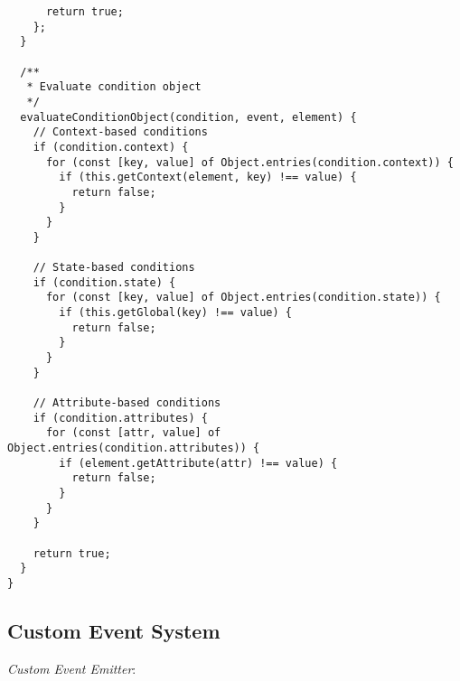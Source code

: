 \documentclass[11pt]{article}
\begin{document}
\begin{verbatim}
      return true;
    };
  }
  
  /**
   * Evaluate condition object
   */
  evaluateConditionObject(condition, event, element) {
    // Context-based conditions
    if (condition.context) {
      for (const [key, value] of Object.entries(condition.context)) {
        if (this.getContext(element, key) !== value) {
          return false;
        }
      }
    }
    
    // State-based conditions
    if (condition.state) {
      for (const [key, value] of Object.entries(condition.state)) {
        if (this.getGlobal(key) !== value) {
          return false;
        }
      }
    }
    
    // Attribute-based conditions
    if (condition.attributes) {
      for (const [attr, value] of Object.entries(condition.attributes)) {
        if (element.getAttribute(attr) !== value) {
          return false;
        }
      }
    }
    
    return true;
  }
}
\end{verbatim}
\subsection{Custom Event System}
\label{sec:org25fd5ba}

\emph{Custom Event Emitter}:
\end{document}
